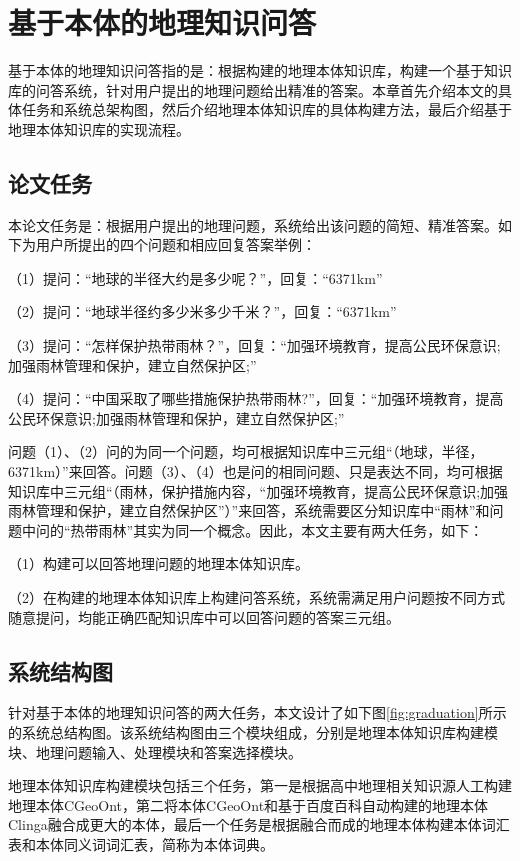 \chapter{基于本体的地理知识问答}\label{chapter:al_sup}
基于本体的地理知识问答指的是：根据构建的地理本体知识库，构建一个基于知识库的问答系统，针对用户提出的地理问题给出精准的答案。本章首先介绍本文的具体任务和系统总架构图，然后介绍地理本体知识库的具体构建方法，最后介绍基于地理本体知识库的实现流程。

\section{论文任务}
本论文任务是：根据用户提出的地理问题，系统给出该问题的简短、精准答案。如下为用户所提出的四个问题和相应回复答案举例：

（1）提问：“地球的半径大约是多少呢？”，回复：“6371km”

（2）提问：“地球半径约多少米多少千米？”，回复：“6371km”

（3）提问：“怎样保护热带雨林？”，回复：“加强环境教育，提高公民环保意识;加强雨林管理和保护，建立自然保护区;”

（4）提问：“中国采取了哪些措施保护热带雨林?”，回复：“加强环境教育，提高公民环保意识;加强雨林管理和保护，建立自然保护区;”

问题（1）、（2）问的为同一个问题，均可根据知识库中三元组“（地球，半径，6371km）”来回答。问题（3）、（4）也是问的相同问题、只是表达不同，均可根据知识库中三元组“（雨林，保护措施内容，“加强环境教育，提高公民环保意识;加强雨林管理和保护，建立自然保护区”）”来回答，系统需要区分知识库中“雨林”和问题中问的“热带雨林”其实为同一个概念。因此，本文主要有两大任务，如下：

（1）构建可以回答地理问题的地理本体知识库。

（2）在构建的地理本体知识库上构建问答系统，系统需满足用户问题按不同方式随意提问，均能正确匹配知识库中可以回答问题的答案三元组。

\section{系统结构图}
针对基于本体的地理知识问答的两大任务，本文设计了如下图\ref{fig:graduation}所示的系统总结构图。该系统结构图由三个模块组成，分别是地理本体知识库构建模块、地理问题输入、处理模块和答案选择模块。

地理本体知识库构建模块包括三个任务，第一是根据高中地理相关知识源人工构建地理本体CGeoOnt，第二将本体CGeoOnt和基于百度百科自动构建的地理本体Clinga融合成更大的本体，最后一个任务是根据融合而成的地理本体构建本体词汇表和本体同义词词汇表，简称为本体词典。

